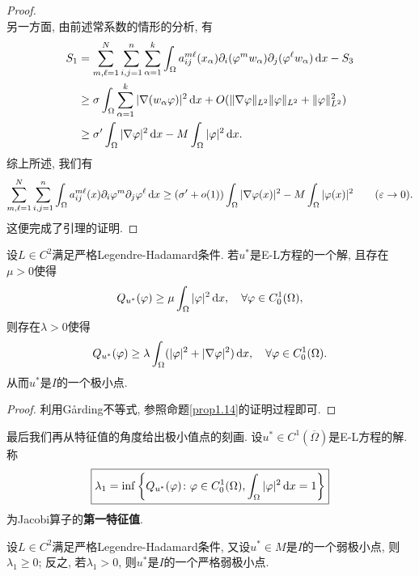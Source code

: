 \begin{lemma}[G\r arding不等式]
\begin{proof}
\begin{equation*}
        \end{equation*}
        另一方面, 由前述常系数的情形的分析, 有 
        \begin{align*}
            S_1 &= \sum_{m, \ell = 1}^N\sum_{i, j = 1}^n\sum_{\alpha = 1}^k\int_{\Omega}a_{ij}^{m\ell}(x_{\alpha})\partial_i(\varphi^mw_{\alpha})\partial_j(\varphi^\ell w_{\alpha}) \,{\rm d}x - S_3 \\ 
            &\geq \sigma\int_{\Omega}\sum_{\alpha = 1}^k|\nabla(w_{\alpha}\varphi)|^2 \,{\rm d}x + O(\Vert \nabla \varphi\Vert_{L^2}\Vert \varphi \Vert_{L^2} + \Vert \varphi \Vert_{L^2}^2) \\  
            &\geq \sigma'\int_{\Omega}|\nabla\varphi|^2 \,{\rm d}x - M\int_{\Omega}|\varphi|^2 \,{\rm d}x.
        \end{align*}
        综上所述, 我们有 
        \begin{equation*}
            \sum_{m, \ell = 1}^N\sum_{i, j = 1}^n\int_{\Omega}a_{ij}^{m\ell}(x)\partial_i\varphi^m\partial_j\varphi^\ell \,{\rm d}x \geq (\sigma'+ o(1))\int_{\Omega}|\nabla\varphi(x)|^2 - M\int_{\Omega}|\varphi(x)|^2  \qquad (\varepsilon \rightarrow 0).
        \end{equation*}
        这便完成了引理的证明.
    \end{proof}
\end{lemma}

\begin{proposition}[充分条件2]
    设$L \in C^2$满足严格Legendre-Hadamard条件. 若$u^*$是E-L方程的一个解, 且存在$\mu > 0$使得 
    \begin{equation*}
        Q_{u^*}(\varphi) \geq \mu\int_{\Omega}|\varphi|^2 \,{\rm d}x, \quad \forall \varphi \in C_0^1(\Omega),
    \end{equation*}
    则存在$\lambda > 0$使得 
    \begin{equation*}
        Q_{u^*}(\varphi) \geq \lambda\int_{\Omega}(|\varphi|^2 + |\nabla\varphi|^2) \,{\rm d}x, \quad \forall\varphi \in C_0^1(\Omega).
    \end{equation*}
    从而$u^*$是$I$的一个极小点.
    \begin{proof}
        利用G\r arding不等式, 参照命题\ref{prop1.14}的证明过程即可.
    \end{proof}
\end{proposition}

最后我们再从特征值的角度给出极小值点的刻画. 设$u^* \in C^1(\overline{\Omega})$是E-L方程的解. 称 
\begin{equation*}
    \boxed{\lambda_1 = \inf\left\{Q_{u^*}(\varphi)\colon \varphi \in C_0^1(\Omega), \int_{\Omega}|\varphi|^2 \,{\rm d}x = 1\right\}}
\end{equation*}
为Jacobi算子的\textbf{第一特征值}.

\begin{proposition}
    设$L \in C^2$满足严格Legendre-Hadamard条件, 又设$u^* \in M$是$I$的一个弱极小点, 则$\lambda_1 \geq 0$;
    反之, 若$\lambda_1 > 0$, 则$u^*$是$I$的一个严格弱极小点.
\end{proposition}
